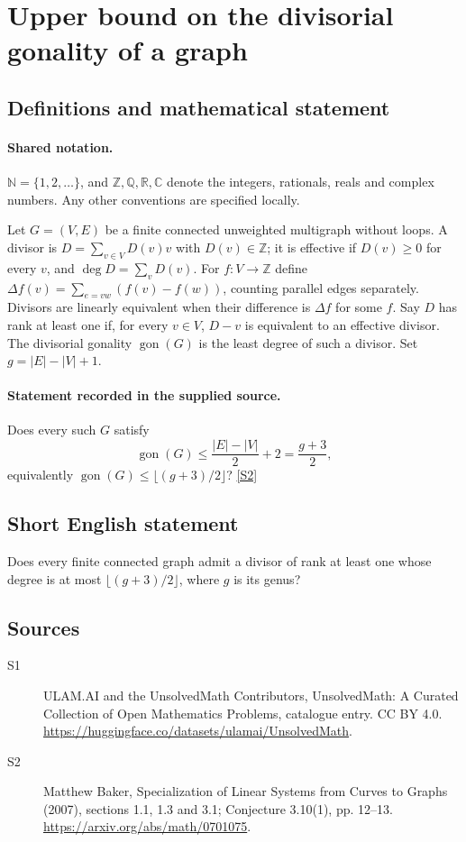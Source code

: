 \documentclass[11pt]{article}
\newcommand{\sref}[2]{\hyperlink{source:#1:#2}{[S#2]}}
\begin{document}
\section{Upper bound on the divisorial gonality of a graph}\label{statement}

\subsection{Definitions and mathematical statement}

\paragraph{Shared notation.}$\mathbb N=\{1,2,\ldots\}$, and $\mathbb Z,\mathbb Q,\mathbb R,\mathbb C$ denote the integers, rationals, reals and complex numbers. Any other conventions are specified locally.


Let $G=(V,E)$ be a finite connected unweighted multigraph without loops. A divisor is $D=\sum_{v\in V}D(v)v$ with $D(v)\in\mathbb Z$; it is effective if $D(v)\geq0$ for every $v$, and $\deg D=\sum_vD(v)$. For $f:V\to\mathbb Z$ define $\Delta f(v)=\sum_{e=vw}(f(v)-f(w))$, counting parallel edges separately. Divisors are linearly equivalent when their difference is $\Delta f$ for some $f$. Say $D$ has rank at least one if, for every $v\in V$, $D-v$ is equivalent to an effective divisor. The divisorial gonality $\operatorname{gon}(G)$ is the least degree of such a divisor. Set $g=|E|-|V|+1$.
\paragraph{Statement recorded in the supplied source.}
Does every such $G$ satisfy
\[\operatorname{gon}(G)\leq\frac{|E|-|V|}{2}+2=\frac{g+3}{2},\]
equivalently $\operatorname{gon}(G)\leq\lfloor(g+3)/2\rfloor$? \sref{statement}{2}
\subsection{Short English statement}
Does every finite connected graph admit a divisor of rank at least one whose degree is at most $\lfloor(g+3)/2\rfloor$, where $g$ is its genus?
\subsection{Sources}
\begin{description}
\item[\hypertarget{source:statement:1}{S1}] ULAM.AI and the UnsolvedMath Contributors, UnsolvedMath: A Curated Collection of Open Mathematics Problems, catalogue entry. CC BY 4.0. \url{https://huggingface.co/datasets/ulamai/UnsolvedMath}.
\item[\hypertarget{source:statement:2}{S2}] Matthew Baker, Specialization of Linear Systems from Curves to Graphs (2007), sections 1.1, 1.3 and 3.1; Conjecture 3.10(1), pp. 12--13. \url{https://arxiv.org/abs/math/0701075}.
\end{description}
\label{end:statement}
\end{document}
